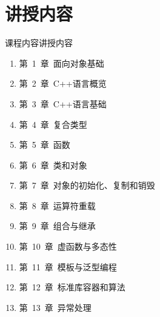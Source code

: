 \section[内容]{讲授内容}\label{sec:chap00-sec04}
\begin{frame}{课程内容}{讲授内容}
  \stretchon
  \begin{enumerate}
  \item 第~1~章~面向对象基础%
  \item 第~2~章~C++语言概览%
  \item 第~3~章~C++语言基础%
  \item 第~4~章~复合类型
  \item 第~5~章~函数%
  \item 第~6~章~类和对象%
  \item 第~7~章~对象的初始化、复制和销毁
  \item 第~8~章~运算符重载%
  \item 第~9~章~组合与继承%
  \item 第~10~章~虚函数与多态性%
  \item 第~11~章~模板与泛型编程%
  \item 第~12~章~标准库容器和算法%
  \item 第~13~章~异常处理
  \end{enumerate}
  \stretchoff
\end{frame}

